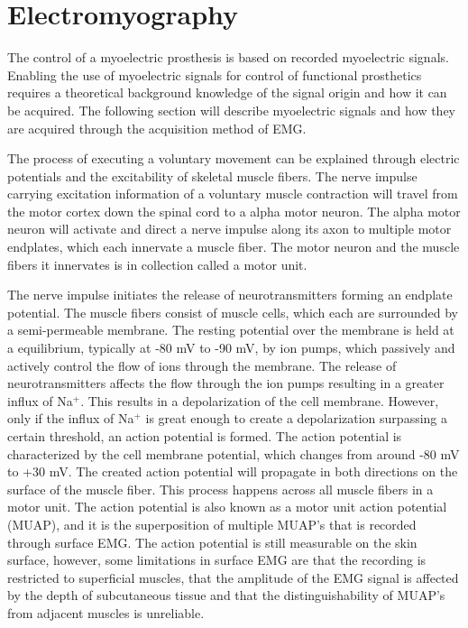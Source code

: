 \section{Electromyography}

The control of a myoelectric prosthesis is based on recorded myoelectric signals. \cite{Geethanjali2016}  Enabling the use of myoelectric signals for control of functional prosthetics requires a theoretical background knowledge of the signal origin and how it can be acquired. The following section will describe myoelectric signals and how they are acquired through the acquisition method of EMG.   

The process of executing a voluntary movement can be explained through electric potentials and the excitability of skeletal muscle fibers. The nerve impulse carrying excitation information of a voluntary muscle contraction will travel from the motor cortex down the spinal cord to a alpha motor neuron. The alpha motor neuron will activate and direct a nerve impulse along its axon to multiple motor endplates, which each innervate a muscle fiber. The motor neuron and the muscle fibers it innervates is in collection called a motor unit. \cite{Turker2013} 

The nerve impulse initiates the release of neurotransmitters forming an endplate potential. The muscle fibers consist of muscle cells, which each are surrounded by a semi-permeable membrane. The resting potential over the membrane is held at a equilibrium, typically at -80 mV to -90 mV, by ion pumps, which passively and actively control the flow of ions through the membrane. The release of neurotransmitters affects the flow through the ion pumps resulting in a greater influx of Na$^+$. This results in a depolarization of the cell membrane. However, only if the influx of Na$^+$ is great enough to create a depolarization surpassing a certain threshold, an action potential is formed. The action potential is characterized by the cell membrane potential, which changes from around -80 mV to +30 mV. %
The created action potential will propagate in both directions on the surface of the muscle fiber. This process happens across all muscle fibers in a motor unit. The action potential is also known as a motor unit action potential (MUAP), and it is the superposition of multiple MUAP's that is recorded through surface EMG. The action potential is still measurable on the skin surface, however, some limitations in surface EMG are that the recording is restricted to superficial muscles, that the amplitude of the EMG signal is affected by the depth of subcutaneous tissue and that the distinguishability of MUAP's from adjacent muscles is unreliable. \cite{Turker2013,Martini2012} 


